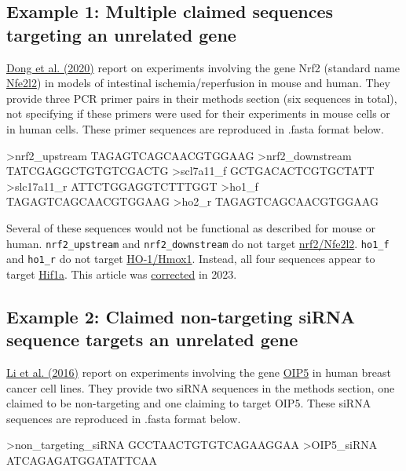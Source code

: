\documentclass[letterpaper, 12pt]{article}
\begin{document}
\pagebreak

\subsection*{Example 1: Multiple claimed sequences targeting an unrelated gene}

\href{https://doi.org/10.18632/aging.103378}{Dong et al. (2020)} report on experiments involving the gene Nrf2 (standard name \href{https://www.ncbi.nlm.nih.gov/gene/18024}{Nfe2l2}) in models of intestinal ischemia/reperfusion in mouse and human. They provide three PCR primer pairs in their methods section (six sequences in total), not specifying if these primers were used for their experiments in mouse cells or in human cells. These primer sequences are reproduced in .fasta format below.

\begin{verbatim*}
>nrf2_upstream
TAGAGTCAGCAACGTGGAAG
>nrf2_downstream
TATCGAGGCTGTGTCGACTG
>scl7a11_f
GCTGACACTCGTGCTATT
>slc17a11_r
ATTCTGGAGGTCTTTGGT
>ho1_f
TAGAGTCAGCAACGTGGAAG
>ho2_r
TAGAGTCAGCAACGTGGAAG
\end{verbatim*}

Several of these sequences would not be functional as described for mouse or human. \verb|nrf2_upstream| and \verb|nrf2_downstream| do not target \href{https://www.ncbi.nlm.nih.gov/gene/18024}{nrf2/Nfe2l2}. \verb|ho1_f| and \verb|ho1_r| do not target \href{https://www.ncbi.nlm.nih.gov/gene/15368}{HO-1/Hmox1}. Instead, all four sequences appear to target \href{https://www.ncbi.nlm.nih.gov/gene/15251}{Hif1a}. This article was \href{https://doi.org/10.18632/aging.205167}{corrected} in 2023.

\subsection*{Example 2: Claimed non-targeting siRNA sequence targets an unrelated gene}

\href{https://doi.org/10.1016/j.gene.2016.11.046}{Li et al. (2016)} report on experiments involving the gene \href{https://www.ncbi.nlm.nih.gov/gene/11339}{OIP5} in human breast cancer cell lines. They provide two siRNA sequences in the methods section, one claimed to be non-targeting and one claiming to target OIP5. These siRNA sequences are reproduced in .fasta format below.

\begin{verbatim*}
>non_targeting_siRNA
GCCTAACTGTGTCAGAAGGAA
>OIP5_siRNA
ATCAGAGATGGATATTCAA
\end{verbatim*}
\end{document}
